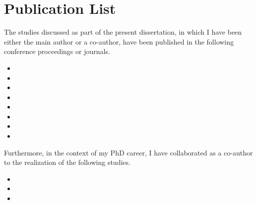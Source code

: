 \chapter{Publication List}
\label{chap:publications}

The studies discussed as part of the present dissertation, in which I have been either the main author or a co-author, have been published in the following conference proceedings or journals.

\preto{}

\begin{itemize}
\item {}
\item {}
\item {}
\item {}
\item {}
\item {}
\item {}
\item {}
\end{itemize}

Furthermore, in the context of my PhD career, I have collaborated as a co-author to the realization of the following studies.

\begin{itemize}
\item {}
\item {}
\item {}
\end{itemize}
